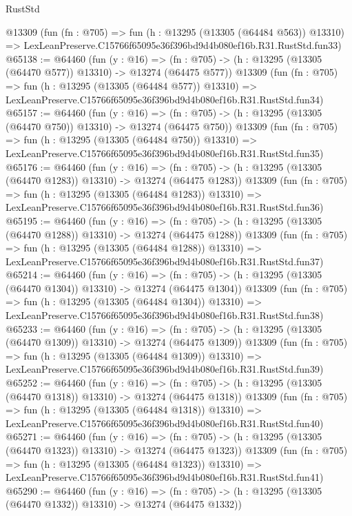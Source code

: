 \begin{lexlean}{RustStd}
\begin{coremodule}
    @13309
    (fun (fn : @705) =>
    fun (h : @13295 (@13305 (@64484 @563)) @13310) =>
    LexLeanPreserve.C15766f65095e36f396bd9d4b080ef16b.R31.RustStd.fun33)
@65138 := @64460
    (fun (y : @16) =>
    (fn : @705) -> (h : @13295 (@13305 (@64470 @577)) @13310) -> @13274 (@64475 @577))
    @13309
    (fun (fn : @705) =>
    fun (h : @13295 (@13305 (@64484 @577)) @13310) =>
    LexLeanPreserve.C15766f65095e36f396bd9d4b080ef16b.R31.RustStd.fun34)
@65157 := @64460
    (fun (y : @16) =>
    (fn : @705) -> (h : @13295 (@13305 (@64470 @750)) @13310) -> @13274 (@64475 @750))
    @13309
    (fun (fn : @705) =>
    fun (h : @13295 (@13305 (@64484 @750)) @13310) =>
    LexLeanPreserve.C15766f65095e36f396bd9d4b080ef16b.R31.RustStd.fun35)
@65176 := @64460
    (fun (y : @16) =>
    (fn : @705) -> (h : @13295 (@13305 (@64470 @1283)) @13310) -> @13274 (@64475 @1283))
    @13309
    (fun (fn : @705) =>
    fun (h : @13295 (@13305 (@64484 @1283)) @13310) =>
    LexLeanPreserve.C15766f65095e36f396bd9d4b080ef16b.R31.RustStd.fun36)
@65195 := @64460
    (fun (y : @16) =>
    (fn : @705) -> (h : @13295 (@13305 (@64470 @1288)) @13310) -> @13274 (@64475 @1288))
    @13309
    (fun (fn : @705) =>
    fun (h : @13295 (@13305 (@64484 @1288)) @13310) =>
    LexLeanPreserve.C15766f65095e36f396bd9d4b080ef16b.R31.RustStd.fun37)
@65214 := @64460
    (fun (y : @16) =>
    (fn : @705) -> (h : @13295 (@13305 (@64470 @1304)) @13310) -> @13274 (@64475 @1304))
    @13309
    (fun (fn : @705) =>
    fun (h : @13295 (@13305 (@64484 @1304)) @13310) =>
    LexLeanPreserve.C15766f65095e36f396bd9d4b080ef16b.R31.RustStd.fun38)
@65233 := @64460
    (fun (y : @16) =>
    (fn : @705) -> (h : @13295 (@13305 (@64470 @1309)) @13310) -> @13274 (@64475 @1309))
    @13309
    (fun (fn : @705) =>
    fun (h : @13295 (@13305 (@64484 @1309)) @13310) =>
    LexLeanPreserve.C15766f65095e36f396bd9d4b080ef16b.R31.RustStd.fun39)
@65252 := @64460
    (fun (y : @16) =>
    (fn : @705) -> (h : @13295 (@13305 (@64470 @1318)) @13310) -> @13274 (@64475 @1318))
    @13309
    (fun (fn : @705) =>
    fun (h : @13295 (@13305 (@64484 @1318)) @13310) =>
    LexLeanPreserve.C15766f65095e36f396bd9d4b080ef16b.R31.RustStd.fun40)
@65271 := @64460
    (fun (y : @16) =>
    (fn : @705) -> (h : @13295 (@13305 (@64470 @1323)) @13310) -> @13274 (@64475 @1323))
    @13309
    (fun (fn : @705) =>
    fun (h : @13295 (@13305 (@64484 @1323)) @13310) =>
    LexLeanPreserve.C15766f65095e36f396bd9d4b080ef16b.R31.RustStd.fun41)
@65290 := @64460
    (fun (y : @16) =>
    (fn : @705) -> (h : @13295 (@13305 (@64470 @1332)) @13310) -> @13274 (@64475 @1332))

\end{coremodule}
\end{lexlean}
